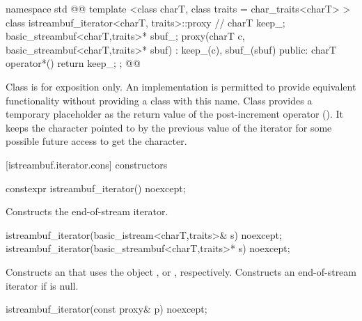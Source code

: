 %
\begin{codeblock}
namespace std { @@
  template <class charT, class traits = char_traits<charT> >
  class istreambuf_iterator<charT, traits>::proxy { // \expos
    charT keep_;
    basic_streambuf<charT,traits>* sbuf_;
    proxy(charT c, basic_streambuf<charT,traits>* sbuf)
      : keep_(c), sbuf_(sbuf) { }
  public:
    charT operator*() { return keep_; }
  };
}@\newtxt{\}\}}@
\end{codeblock}

\pnum
Class
is for exposition only.
An implementation is permitted to provide equivalent functionality without
providing a class with this name.
Class
provides a temporary
placeholder as the return value of the post-increment operator
().
It keeps the character pointed to by the previous value
of the iterator for some possible future access to get the character.

[istreambuf.iterator.cons]{ constructors}


%
\begin{itemdecl}
constexpr istreambuf_iterator() noexcept;
\end{itemdecl}

\begin{itemdescr}
\pnum
\effects
Constructs the end-of-stream iterator.
\end{itemdescr}


%
\begin{itemdecl}
istreambuf_iterator(basic_istream<charT,traits>& s) noexcept;
istreambuf_iterator(basic_streambuf<charT,traits>* s) noexcept;
\end{itemdecl}

\begin{itemdescr}
\pnum
\effects
Constructs an
that uses the
object
,
or
,
respectively.
Constructs an end-of-stream iterator if
is null.
\end{itemdescr}


%
\begin{itemdecl}
istreambuf_iterator(const proxy& p) noexcept;
\end{itemdecl}

